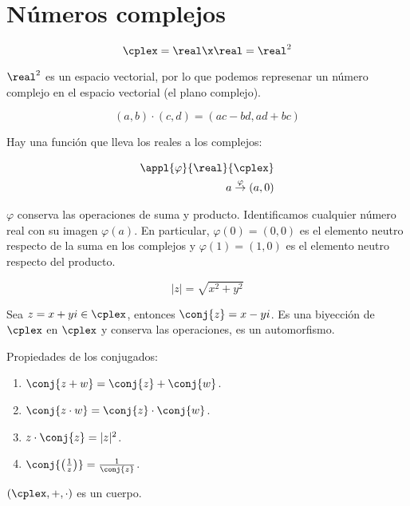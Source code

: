 \documentclass[nochap]{apuntes}
\begin{document}
\section{Números complejos}

\begin{defn}\[ \cplex=\real \x \real = \real ^2 \] \end{defn}

$\real^2$ es un espacio vectorial, por lo que podemos represenar un número complejo en el espacio vectorial (el plano complejo).

\begin{defn}
\[ (a,b) \cdot (c,d) = (ac-bd, ad+bc) \]
\end{defn}

\begin{remark} Hay una función que lleva los reales a los complejos:

\begin{align*}
\appl{\varphi}{\real}{\cplex} \\
a\overset{\varphi}{\rightarrow}(a,0)
\end{align*}

$\varphi$ conserva las operaciones de suma y producto. Identificamos cualquier número real con su imagen $\varphi(a)$. En particular, $\varphi(0)=(0,0)$ es el elemento neutro respecto de la suma en los complejos y $\varphi(1)=(1,0)$ es el elemento neutro respecto del producto.
\end{remark}

\begin{defn}[Módulo] \[|z|=\sqrt{x^2+y^2} \] \end{defn}

\begin{defn}[Conjugación] Sea $z=x+yi \in \cplex$, entonces $\conj{z}=x-yi$. Es una biyección de $\cplex$ en $\cplex$ y conserva las operaciones, es un automorfismo.\end{defn}


Propiedades de los conjugados:
\begin{enumerate}
\item $\conj{z+w}=\conj{z}+\conj{w}$.
\item $\conj{z\cdot w}=\conj{z}\cdot \conj{w}$.
\item $z\cdot\conj{z}=|z|^2$.
\item $\conj{\left(\frac{1}{z}\right)}=\frac{1}{\conj{z}}$.
\end{enumerate}

\begin{theorem}$(\cplex, +, \cdot)$ es un cuerpo.\end{theorem}
\end{document}
